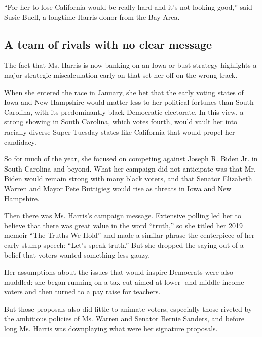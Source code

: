 ``For her to lose California would be really hard and it's not looking
good,'' said Susie Buell, a longtime Harris donor from the Bay Area.

\hypertarget{a-team-of-rivals-with-no-clear-message}{%
\subsection{A team of rivals with no clear
message}\label{a-team-of-rivals-with-no-clear-message}}

The fact that Ms. Harris is now banking on an Iowa-or-bust strategy
highlights a major strategic miscalculation early on that set her off on
the wrong track.

When she entered the race in January, she bet that the early voting
states of Iowa and New Hampshire would matter less to her political
fortunes than South Carolina, with its predominantly black Democratic
electorate. In this view, a strong showing in South Carolina, which
votes fourth, would vault her into racially diverse Super Tuesday states
like California that would propel her candidacy.

So for much of the year, she focused on competing against
\href{https://www.nytimes.com/interactive/2020/us/elections/joe-biden.html}{Joseph
R. Biden Jr.} in South Carolina and beyond. What her campaign did not
anticipate was that Mr. Biden would remain strong with many black
voters, and that Senator
\href{https://www.nytimes.com/interactive/2020/us/elections/elizabeth-warren.html}{Elizabeth
Warren} and Mayor
\href{https://www.nytimes.com/interactive/2020/us/elections/pete-buttigieg.html}{Pete
Buttigieg} would rise as threats in Iowa and New Hampshire.

Then there was Ms. Harris's campaign message. Extensive polling led her
to believe that there was great value in the word ``truth,'' so she
titled her 2019 memoir ``The Truths We Hold'' and made a similar phrase
the centerpiece of her early stump speech: ``Let's speak truth.'' But
she dropped the saying out of a belief that voters wanted something less
gauzy.

Her assumptions about the issues that would inspire Democrats were also
muddled: she began running on a tax cut aimed at lower- and
middle-income voters and then turned to a pay raise for teachers.

But those proposals also did little to animate voters, especially those
riveted by the ambitious policies of Ms. Warren and Senator
\href{https://www.nytimes.com/interactive/2020/us/elections/bernie-sanders.html}{Bernie
Sanders}, and before long Ms. Harris was downplaying what were her
signature proposals.

